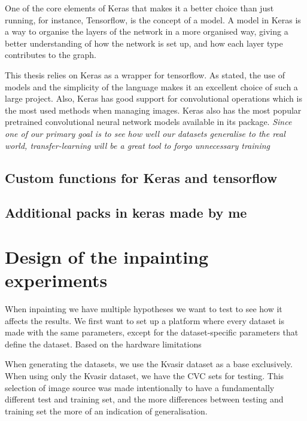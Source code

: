 One of the core elements of Keras that makes it a better choice than just running, for instance, Tensorflow, is the concept of a model. A model in Keras is a way to organise the layers of the network in a more organised way, giving a better understanding of how the network is set up, and how each layer type contributes to the graph. 

This thesis relies on Keras as a wrapper for tensorflow. As stated, the use of models and the simplicity of the language makes it an excellent choice of such a large project. Also, Keras has good support for convolutional operations which is the most used methods when managing images. Keras also has the most popular pretrained convolutional neural network models available in its package. \textit{Since one of our primary goal is to see how well our datasets generalise to the real world, transfer-learning will be a great tool to forgo unnecessary training}




\subsection{Custom functions for Keras and tensorflow}


    
    \subsection{Additional packs in keras made by me}

\section{Design of the inpainting experiments}
When inpainting we have multiple hypotheses we want to test to see how it affects the results. We first want to set up a platform where every dataset is made with the same parameters, except for the dataset-specific parameters that define the dataset. Based on the hardware limitations 

When generating the datasets, we use the Kvasir dataset as a base exclusively. When using only the Kvasir dataset, we have the CVC sets for testing. This selection of image source was made intentionally to have a fundamentally different test and training set, and the more differences between testing and training set the more of an indication of generalisation. 


